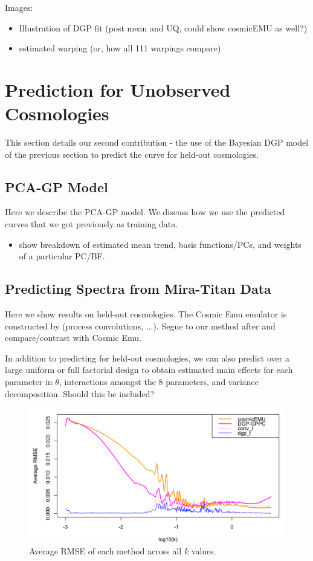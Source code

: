 \documentclass[11pt]{article}
\begin{document}
Images:
\begin{itemize}
    \item Illustration of DGP fit (post mean and UQ, could show cosmicEMU as well?)
    \item estimated warping (or, how all 111 warpings compare)
\end{itemize}


\section{Prediction for Unobserved Cosmologies}
\label{sec:pred}

This section details our second contribution - the use of the Bayesian DGP model of the previous section to predict the curve for held-out cosmologies.

\subsection{PCA-GP Model}
\label{subsec:pca}

Here we describe the PCA-GP model.  We discuss how we use the predicted curves that we got previously as training data.

\begin{itemize}
    \item show breakdown of estimated mean trend, basis functions/PCs, and weights of a particular PC/BF.
\end{itemize}

\subsection{Predicting Spectra from Mira-Titan Data}
\label{subsec:mira_pred}

Here we show results on held-out cosmologies.  The Cosmic Emu emulator is constructed by (process convolutions, ...). Segue to our method after and compare/contrast with Cosmic Emu. 

In addition to predicting for held-out cosmologies, we can also predict over a large uniform or full factorial design to obtain estimated main effects for each parameter in $\theta$, interactions amongst the 8 parameters, and variance decomposition. Should this be included?

\begin{figure}[ht]
    \centering
    \includegraphics[width=6in]{rmse_by_k.png}
    \caption{Average RMSE of each method across all $k$ values.}
    \label{fig:plot_rmse_k}
\end{figure}
\end{document}
